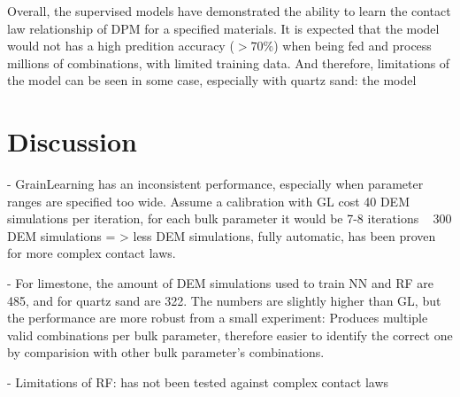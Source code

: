 Overall, the supervised models have demonstrated the ability to learn the contact law relationship of DPM for a specified materials. It is expected that the model would not has a high predition accuracy ($>70\%$) when being fed and process millions of combinations, with limited training data. And therefore, limitations of the model can be seen in some case, especially with quartz sand: the model


\section{Discussion}\label{section:discussion}

- GrainLearning has an inconsistent performance, especially when parameter ranges are specified too wide. Assume a calibration with GL cost 40 DEM simulations per iteration, for each bulk parameter it would be 7-8 iterations ~ 300 DEM simulations = > less DEM simulations, fully automatic, has been proven for more complex contact laws. 

- For limestone, the amount of DEM simulations used to train NN and RF are 485, and for quartz sand are 322. The numbers are slightly higher than GL, but the performance are more robust from a small experiment: Produces multiple valid combinations per bulk parameter, therefore easier to identify the correct one by comparision with other bulk parameter's combinations. 

- Limitations of RF: has not been tested against complex contact laws

